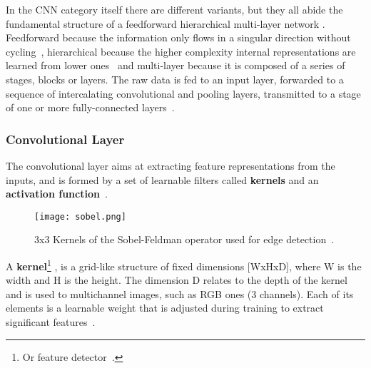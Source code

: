 \documentclass[class=report, crop=false, a4paper, 12pt]{standalone}
\begin{document}

\par In the CNN category itself there are different variants, but they all abide the fundamental structure of a feedforward hierarchical multi-layer network . Feedforward because the information only flows in a singular direction without cycling~\autocite{zellSimulationNeuronalerNetze1994}, hierarchical because the higher complexity internal representations are learned from lower ones~\autocite{lecunDeepLearning2015, zhuBCNNBranchConvolutional2017} and multi-layer because it is composed of a series of stages, blocks or layers. The raw data is fed to an input layer, forwarded to a sequence of intercalating convolutional and pooling layers, transmitted to a stage of one or more fully-connected layers~\autocite{lecunDeepLearning2015, guRecentAdvancesConvolutional2018, alzubaidiReviewDeepLearning2021}.   

\subsubsection{Convolutional Layer}
\par The convolutional layer aims at extracting feature representations from the inputs, and is formed by a set of learnable filters called \textbf{kernels} and an \textbf{activation function}~\autocite{guRecentAdvancesConvolutional2018,yamashitaConvolutionalNeuralNetworks2018}. 

\begin{figure}[!h]
    \centering
    \texttt{[image: sobel.png]}
    \caption{3x3 Kernels of the Sobel-Feldman operator used for edge detection~\autocite{sobelIsotropicGradientOperator1973}.}
    \label{fig:sobel}
\end{figure}

A \textbf{kernel}\footnote{Or feature detector~\autocite{ajitReviewConvolutionalNeural2020}.} , is a grid-like structure of fixed dimensions [WxHxD], where W is the width and H is the height. The dimension D relates to the depth of the kernel and is used to multichannel images, such as RGB ones (3 channels). Each of its elements is a learnable weight that is adjusted during training to extract significant features~\autocite{alzubaidiReviewDeepLearning2021}. 
\end{document}
